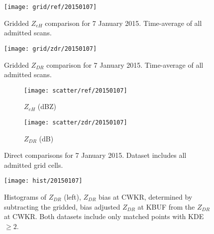 \begin{figure}[H]
\texttt{[image: grid/ref/20150107]}
\caption{Gridded $Z_{eH}$ comparison for 7 January 2015. Time-average of all admitted scans.} 
\label{fig:grid_ref_20150107}
\end{figure}

\begin{figure}[H]
\texttt{[image: grid/zdr/20150107]}
\caption{Gridded $Z_{DR}$ comparison for 7 January 2015. Time-average of all admitted scans.} 
\label{fig:grid_zdr_20150107}
\end{figure}
\begin{figure}[H]
\centering
   \begin{subfigure}{0.49\linewidth} \centering
     \texttt{[image: scatter/ref/20150107]}
     \caption{$Z_{eH}$ (dBZ)}\label{fig:scatter_ref_20150107}
   \end{subfigure}
   \begin{subfigure}{0.49\linewidth} \centering
     \texttt{[image: scatter/zdr/20150107]}
     \caption{$Z_{DR}$ (dB)}\label{fig:scatter_zdr_20150107}
   \end{subfigure}
\caption{Direct comparisons for 7 January 2015. Dataset includes all admitted grid cells.} \label{fig:scatter_20150107}
\end{figure}

\begin{figure}[H]
\texttt{[image: hist/20150107]}\centering
\caption{Histograms of $Z_{DR}$ (left), $Z_{DR}$ bias at CWKR, determined by subtracting the gridded, bias adjusted $Z_{DR}$ at KBUF from the $Z_{DR}$ at
CWKR. Both datasets include only matched points with KDE $\geq 2$. } 
\label{fig:hist_20150107}
\end{figure}

